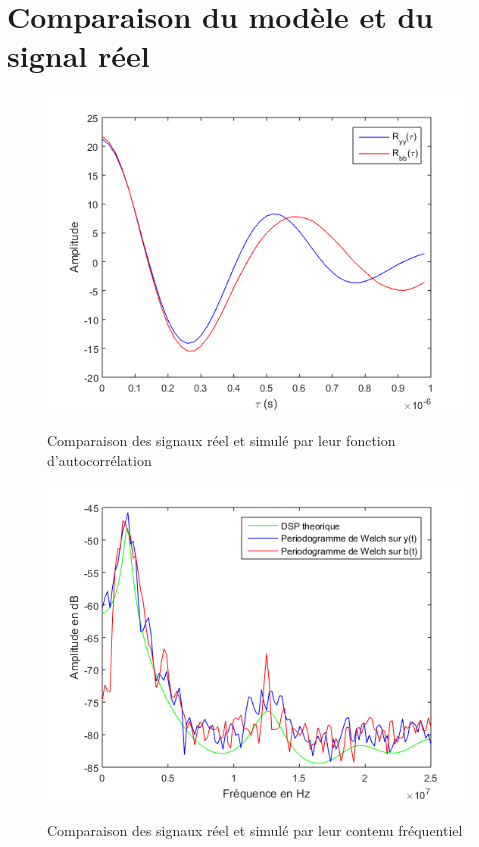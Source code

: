 \documentclass[a4paper]{article}
\begin{document}
\section{Comparaison du modèle et du signal réel}

\begin{figure}[!h]
	\centering
	\includegraphics[scale=0.5]{autocorr.png}
    \label{autocorr}
    \caption{Comparaison des signaux réel et simulé par leur fonction d'autocorrélation}
\end{figure}

\begin{figure}[!h]
	\centering
	\includegraphics[scale=0.5]{dsp1.png}
    \label{dsp}
    \caption{Comparaison des signaux réel et simulé par leur contenu fréquentiel}
\end{figure}
\end{document}
